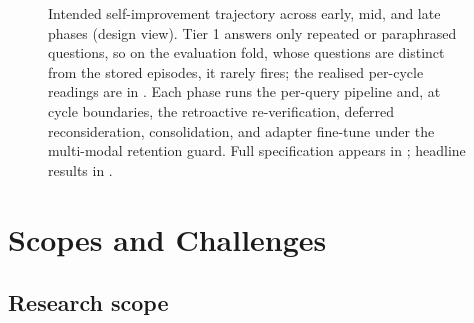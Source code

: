 \begin{figure}[H]
\caption[Experimental workflow]{Intended self-improvement trajectory across early, mid, and late phases (design view). Tier 1 answers only repeated or paraphrased questions, so on the evaluation fold, whose questions are distinct from the stored episodes, it rarely fires; the realised per-cycle readings are in . Each phase runs the per-query pipeline and, at cycle boundaries, the retroactive re-verification, deferred reconsideration, consolidation, and adapter fine-tune under the multi-modal retention guard. Full specification appears in ; headline results in .}
\label{fig:experimental-workflow}
\end{figure}

\section{Scopes and Challenges}
\label{sec:scope}

\subsection{Research scope}
\label{sec:scope-research}

